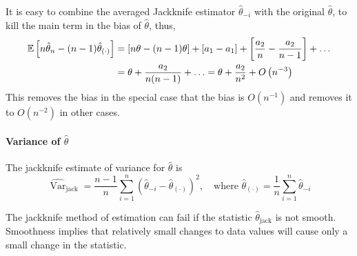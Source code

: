 \begin{remark}
	It is easy to combine the averaged Jackknife estimator $\hat{\theta}_{-i}$ with the original $\hat{\theta}$, to kill the main term in the bias of $\hat{\theta}$, thus,
	\begin{equation*}
		\begin{aligned}
			{\mathbb E}\left[n\hat{\theta}_{n}-(n-1)\hat{\theta}_{(\cdot)}\right] & =\left[n\theta-(n-1)\theta\right]+\left[a_{1}-a_{1}\right]+\left[\frac{a_{2}}{n}-\frac{a_{2}}{n-1}\right]+\ldots \\
			                                                               & =\theta+\frac{a_{2}}{n(n-1)}+\ldots=\theta+\frac{a_{2}}{n^{2}}+O\left(n^{-3}\right)
		\end{aligned}
	\end{equation*}
	This removes the bias in the special case that the bias is $O\left(n^{-1}\right)$ and removes it to $O\left(n^{-2}\right)$ in other cases.
\end{remark}

\paragraph{Variance of $\hat{\theta}$}

The jackknife estimate of variance for $\hat{\theta}$ is
\begin{equation}
	\widehat{\operatorname{Var}}_{\text{jack}}=\frac{n-1}{n}\sum_{i=1}^{n}\left(\hat{\theta}_{-i}-\hat{\theta}_{(\cdot)}\right)^{2},\quad\text{where }\hat{\theta}_{(\cdot)}=\frac{1}{n}\sum_{i=1}^{n}\hat{\theta}_{-i}
\end{equation}

The jackknife method of estimation can fail if the statistic $\hat{\theta}_{\text{jack}}$ is not smooth. Smoothness
implies that relatively small changes to data values will cause only a small change in the
statistic.

\begin{example}

\end{example}

\begin{example}

\end{example}
